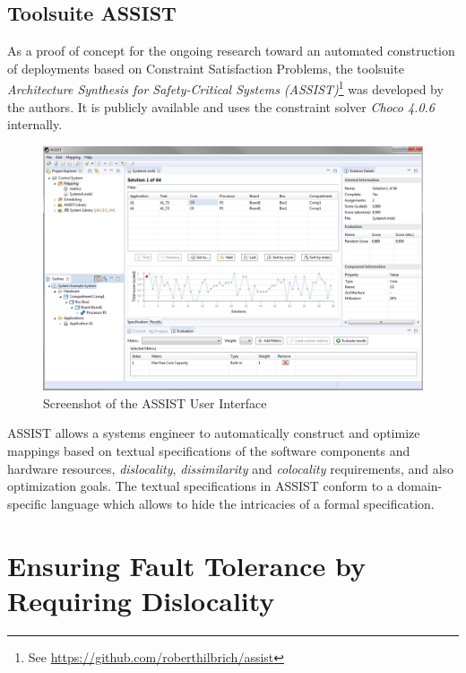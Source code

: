 \documentclass[english,biblatex]{lni}
\begin{document}
\subsection{Toolsuite ASSIST}

As a proof of concept for the ongoing research toward an automated construction of deployments based on Constraint Satisfaction Problems, the toolsuite \emph{Architecture Synthesis for Safety-Critical Systems (ASSIST)}\footnote{See \url{https://github.com/roberthilbrich/assist}} was developed by the authors.
It is publicly available and uses the constraint solver \emph{Choco 4.0.6}~\cite{Prudhomme2016} internally.

\begin{figure}[htbp]
\centering
\includegraphics[width=\textwidth]{assist-screenshot}
\caption{Screenshot of the ASSIST User Interface}
\label{tool}
\end{figure}

ASSIST allows a systems engineer to automatically construct and optimize mappings based on textual specifications of the software components and hardware resources, \textit{dislocality}, \textit{dissimilarity} and \textit{colocality} requirements, and also optimization goals.
The textual specifications in ASSIST conform to a domain-specific language which allows to hide the intricacies of a formal specification.

\section{Ensuring Fault Tolerance by Requiring Dislocality}
\end{document}
